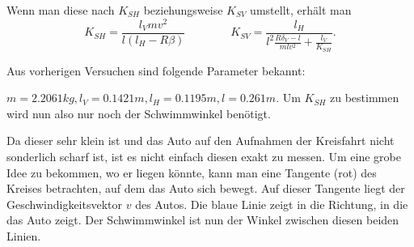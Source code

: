 Wenn man diese nach $K_{SH}$ beziehungsweise $K_{SV}$ umstellt, erhält man 
$$
K_{SH}=\frac{l_V mv^2}{l(l_H-R\beta)} \qquad \qquad K_{SV}=\frac{l_H}{l^2\frac{R\delta_V-l}{mlv^2}+\frac{l_V}{K_{SH}}}.
$$

Aus vorherigen Versuchen sind folgende Parameter bekannt:

$m=2.2061 kg,l_V=0.1421 m,l_H=0.1195 m,l=0.261 m$. Um $K_{SH}$ zu bestimmen wird nun also nur noch der Schwimmwinkel benötigt. 



Da dieser sehr klein ist und das Auto auf den Aufnahmen der Kreisfahrt nicht sonderlich scharf ist, ist es nicht einfach diesen exakt zu messen. Um eine grobe Idee zu bekommen, wo er liegen könnte, kann man eine Tangente (rot) des Kreises betrachten, auf dem das Auto sich bewegt. Auf dieser Tangente liegt der Geschwindigkeitsvektor $v$ des Autos. Die blaue Linie zeigt in die Richtung, in die das Auto zeigt. Der Schwimmwinkel ist nun der Winkel zwischen diesen beiden Linien. 


